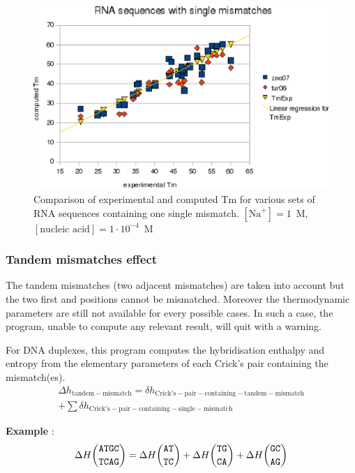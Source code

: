 \documentclass{article}
\begin{document}
\begin{figure}[h]
\includegraphics{images/RNASingleMismatch.eps}
\caption{Comparison of experimental and computed Tm for various sets of
 RNA sequences containing one single mismatch. $[\mbox{Na}^+] = 1$~M, $[\mbox{nucleic acid}] = 1\cdot{}10^{-4}$~M}
\end{figure}

\subsubsection{Tandem mismatches effect}

The tandem mismatches (two adjacent mismatches) are taken into account but the two first and positions cannot
be mismatched. Moreover the thermodynamic parameters are still not available for every possible cases.
In such a case, the program, unable to compute any relevant result, will quit with a warning.

For DNA duplexes, this program computes the hybridisation enthalpy and entropy from the elementary 
parameters of each Crick's pair containing the mismatch(es). 
\begin{multline*}
\Delta{}h_\mathrm{tandem-mismatch} =
\delta{}h_\mathrm{Crick's-pair-containing-tandem-mismatch} \\ + 
\sum \delta{}h_\mathrm{Crick's-pair-containing-single-mismatch}
\end{multline*}


\textbf{Example} :
\begin{multline*}
\Delta H {\mbox{\texttt{ATGC}} \choose \mbox{\texttt{TCAG}}} = 
\Delta H {\mbox{\texttt{AT}} \choose \mbox{\texttt{TC}} } + 
\Delta H {\mbox{\texttt{TG}} \choose \mbox{\texttt{CA}} } + 
\Delta H {\mbox{\texttt{GC}} \choose \mbox{\texttt{AG}} } \\
\end{multline*}
\end{document}
